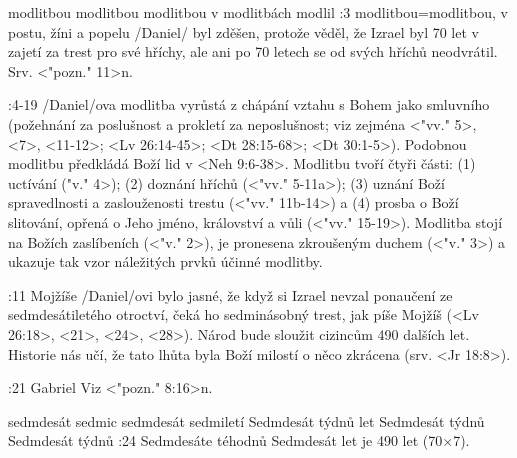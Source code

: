         
    {modlitbou} %
    {modlitbou}  %
    {modlitbou} %
    {v modlitbách}  %
    {modlil}  %
:3 {modlitbou}={modlitbou, v postu, žíni a popelu} \x/Daniel/ byl zděšen, protože věděl, že Izrael byl 70 let v zajetí za trest pro své hříchy, ale ani po 70 letech se od svých hříchů neodvrátil. Srv. <"pozn." 11>n.

:4-19 {} \x/Daniel/ova modlitba vyrůstá z chápání vztahu s Bohem jako smluvního (požehnání za poslušnost a prokletí za neposlušnost; viz zejména <"vv." 5>, <7>, <11-12>; <Lv 26:14-45>; <Dt 28:15-68>; <Dt 30:1-5>). Podobnou modlitbu předkládá Boží lid v <Neh 9:6-38>. Modlitbu tvoří čtyři části: (1) uctívání (\<"v." 4>);  (2) doznání hříchů (<"vv." 5-11a>); (3) uznání Boží spravedlnosti a zaslouženosti trestu (<"vv." 11b-14>) a (4) prosba o Boží slitování, opřená o Jeho jméno, království a vůli (<"vv." 15-19>). Modlitba stojí na Božích zaslíbeních (<"v." 2>), je pronesena zkroušeným duchem (<"v." 3>) a ukazuje tak vzor náležitých prvků účinné modlitby.

:11 {Mojžíše} \x/Daniel/ovi bylo jasné, že když si Izrael nevzal ponaučení ze sedmdesátiletého otroctví, čeká ho sedminásobný trest, jak píše Mojžíš (<Lv 26:18>, <21>, <24>, <28>). Národ bude sloužit cizincům 490 dalších let. Historie nás učí, že tato lhůta byla Boží milostí o něco zkrácena (srv. <Jr 18:8>).
\dopsat


:21 {Gabriel} Viz <"pozn." 8:16>n. 

 {sedmdesát sedmic} {sedmdesát sedmiletí} {Sedmdesát týdnů let} {Sedmdesát týdnů} {Sedmdesát týdnů}
:24 {Sedmdesáte téhodnů} Sedmdesát  let je 490 let (70$\times$7).

